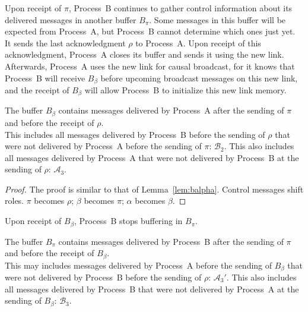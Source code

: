 \noindent Upon receipt of $\pi$, Process~B continues to gather control information about
its delivered messages in another buffer $B_\pi$. Some messages in this buffer
will be expected from Process~A, but Process~B cannot determine which ones just
yet. It sends the last acknowledgment $\rho$ to Process~A. Upon receipt of this
acknowledgment, Process~A closes its buffer and sends it using the new
link. Afterwards, Process~A uses the new link for causal broadcast, for it knows
that Process~B will receive $B_\beta$ before upcoming broadcast messages on this
new link, and the receipt of $B_\beta$ will allow Process~B to initialize this
new link memory.


\begin{lemma}
  The buffer $B_\beta$ contains messages delivered by Process~A after the
  sending of $\pi$ and before the receipt of $\rho$.\\
  This includes all messages delivered by Process~B before the sending of
  $\rho$ that were not delivered by Process~A before the sending of $\pi$:
  $\mathcal{B}_2$. This also includes all messages delivered by Process~A that
  were not delivered by Process~B at the sending of $\rho$: $\mathcal{A}_3$.
\end{lemma}
  
\begin{proof}
  The proof is similar to that of Lemma~\ref{lem:balpha}. Control messages
  shift roles. $\pi$ becomes $\rho$; $\beta$ becomes $\pi$; $\alpha$ becomes
  $\beta$.
\end{proof}

\noindent Upon receipt of $B_\beta$, Process~B stops buffering in $B_\pi$.
  
\begin{lemma}
  The buffer $B_\pi$ contains messages delivered by Process~B after the
  sending of $\pi$ and before the receipt of $B_\beta$.\\
  This may includes messages delivered by Process~A before the sending of
  $B_\beta$ that were not delivered by Process~B before the sending of $\rho$:
  $\mathcal{A}_3'$. This also includes all messages delivered by Process~B that
  were not delivered by Process~A at the sending of $B_\beta$:
  $\mathcal{B}_3$. 
\end{lemma}

